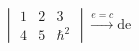 
\begin{equation}
\begin{vmatrix}1&2&3\\4&5&\hbar^2\end{vmatrix}\xrightarrow{e = c}\mathrm{de}
\end{equation}
